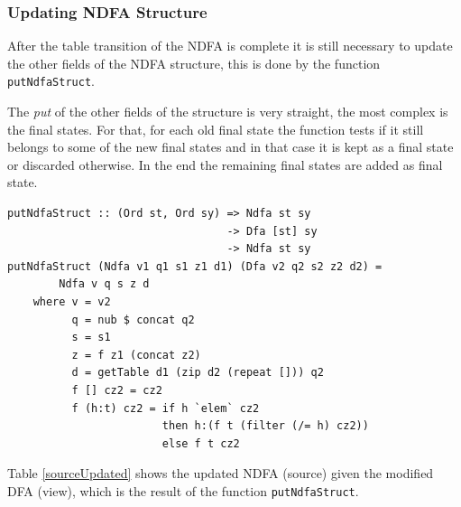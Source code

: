 \subsubsection{Updating NDFA Structure}
After the table transition of the NDFA is complete it is still necessary to update the other fields of the NDFA structure, this is done by the function \texttt{putNdfaStruct}.

The \textit{put} of the other fields of the structure is very straight, the most complex is the final states. For that, for each old final state the function tests if it still belongs to some of the new final states and in that case it is kept as a final state or discarded otherwise. In the end the remaining final states are added as final state. 

\begin{verbatim}
putNdfaStruct :: (Ord st, Ord sy) => Ndfa st sy  
                                  -> Dfa [st] sy 
                                  -> Ndfa st sy
putNdfaStruct (Ndfa v1 q1 s1 z1 d1) (Dfa v2 q2 s2 z2 d2) = 
        Ndfa v q s z d
    where v = v2
          q = nub $ concat q2
          s = s1
          z = f z1 (concat z2)
          d = getTable d1 (zip d2 (repeat [])) q2
          f [] cz2 = cz2
          f (h:t) cz2 = if h `elem` cz2 
                        then h:(f t (filter (/= h) cz2))
                        else f t cz2
\end{verbatim}

\vspace{5mm}
Table \ref{sourceUpdated} shows the updated NDFA (source) given the modified DFA (view), which is the result of the function \texttt{putNdfaStruct}.

